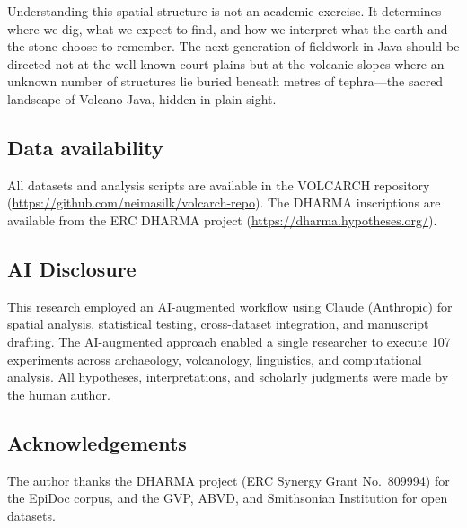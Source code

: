 \documentclass[12pt]{article}
\begin{document}
Understanding this spatial structure is not an academic exercise.
It determines where we dig, what we expect to find, and how we interpret what the earth and the stone choose to remember.
The next generation of fieldwork in Java should be directed not at the well-known court plains but at the volcanic slopes where an unknown number of structures lie buried beneath metres of tephra---the sacred landscape of Volcano Java, hidden in plain sight.


\subsection*{Data availability}

All datasets and analysis scripts are available in the VOLCARCH repository (\url{https://github.com/neimasilk/volcarch-repo}).
The DHARMA inscriptions are available from the ERC DHARMA project (\url{https://dharma.hypotheses.org/}).

\subsection*{AI Disclosure}

This research employed an AI-augmented workflow using Claude (Anthropic) for spatial analysis, statistical testing, cross-dataset integration, and manuscript drafting.
The AI-augmented approach enabled a single researcher to execute 107 experiments across archaeology, volcanology, linguistics, and computational analysis.
All hypotheses, interpretations, and scholarly judgments were made by the human author.

\subsection*{Acknowledgements}

The author thanks the DHARMA project (ERC Synergy Grant No.\ 809994) for the EpiDoc corpus, and the GVP, ABVD, and Smithsonian Institution for open datasets.


\end{document}
